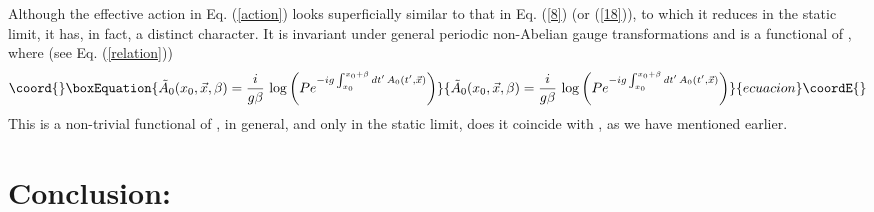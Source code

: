 \documentclass[a4paper,12pt]{article}
\begin{document}
Although the effective action in Eq. (\ref{action}) looks superficially similar
to that in Eq. (\ref{8}) (or (\ref{18})), to which it reduces in the
static limit, it has, in fact, a distinct character. It is invariant
under  general periodic non-Abelian gauge transformations and is a
functional of \coordHE{}, where (see
Eq. (\ref{relation}))
\begin{equation}\coord{}\boxEquation{
\tilde{A}_{0}(x_{0},\vec{x},\beta) =  {i\over g\beta}\,\log \left(P
  e^{-ig\int_{x_{0}}^{x_{0}+\beta} dt'\,A_{0}(t',\vec{x})}\right)
}{
\tilde{A}_{0}(x_{0},\vec{x},\beta) =  {i\over g\beta}\,\log \left(P
  e^{-ig\int_{x_{0}}^{x_{0}+\beta} dt'\,A_{0}(t',\vec{x})}\right)
}{ecuacion}\coordE{}\end{equation}
This is a non-trivial functional of \coordHE{}, in general, and only
in the static limit, does it coincide with \coordHE{}, as we
have mentioned earlier.


\section{Conclusion:}
\end{document}
